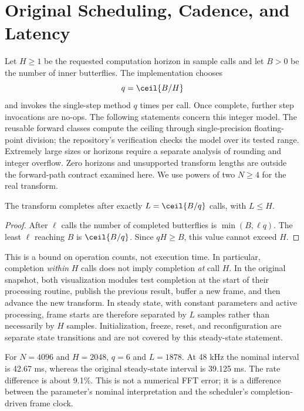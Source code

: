 \section{Original Scheduling, Cadence, and Latency}
\label{sec:scheduling}
Let $H\ge1$ be the requested computation horizon in sample calls and let $B>0$
be the number of inner butterflies. The implementation chooses
\begin{equation}
 q=\ceil{B/H}
 \label{eq:quota}
\end{equation}
and invokes the single-step method $q$ times per call. Once complete, further
step invocations are no-ops. The following statements concern this integer
model. The reusable forward classes compute the ceiling through
single-precision floating-point division; the repository's verification
checks the model over its tested range. Extremely large sizes or horizons require a separate analysis of
rounding and integer overflow. Zero horizons and unsupported transform lengths
are outside the forward-path contract examined here. We use powers of two
$N\ge4$ for the real transform.

\begin{proposition}
The transform completes after exactly $L=\ceil{B/q}$ calls, with $L\le H$.
\end{proposition}
\begin{proof}
After $\ell$ calls the number of completed butterflies is
$\min(B,\ell q)$. The least $\ell$ reaching $B$ is $\ceil{B/q}$.
Since $qH\ge B$, this value cannot exceed $H$.
\end{proof}

This is a bound on operation counts, not execution time. In particular,
completion \emph{within} $H$ calls does not imply completion \emph{at} call $H$.
In the original snapshot, both visualization modules test completion at the start of their processing
routine, publish the previous result, buffer a new frame, and then advance the
new transform. In steady state, with constant parameters and active processing,
frame starts are therefore separated by $L$ samples rather than necessarily by
$H$ samples. Initialization, freeze, reset, and reconfiguration are separate
state transitions and are not covered by this steady-state statement.



For $N=4096$ and $H=2048$, $q=6$ and $L=1878$. At 48 kHz the nominal
interval is 42.67 ms, whereas the original steady-state interval is
39.125 ms. The rate difference is about 9.1\%. This is not a numerical FFT
error; it is a difference between the parameter's nominal interpretation and
the scheduler's completion-driven frame clock.

